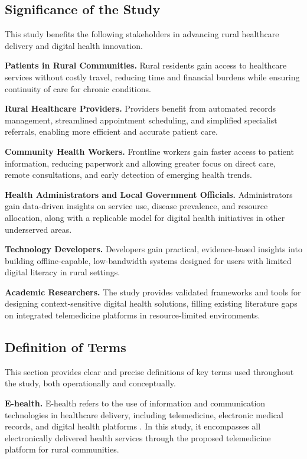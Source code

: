 \documentclass{research}
\begin{document}
\subsection*{Significance of the Study}

This study benefits the following stakeholders in advancing rural healthcare delivery and digital
health innovation.

\textbf{Patients in Rural Communities.} Rural residents gain access to healthcare services
without costly travel, reducing time and financial burdens while ensuring continuity of care for
chronic conditions.

\textbf{Rural Healthcare Providers.} Providers benefit from automated records management,
streamlined appointment scheduling, and simplified specialist referrals, enabling more efficient
and accurate patient care.

\textbf{Community Health Workers.} Frontline workers gain faster access to patient information,
reducing paperwork and allowing greater focus on direct care, remote consultations, and early
detection of emerging health trends.

\textbf{Health Administrators and Local Government Officials.} Administrators gain data-driven
insights on service use, disease prevalence, and resource allocation, along with a replicable
model for digital health initiatives in other underserved areas.

\textbf{Technology Developers.} Developers gain practical, evidence-based insights into building
offline-capable, low-bandwidth systems designed for users with limited digital literacy in rural
settings.

\textbf{Academic Researchers.} The study provides validated frameworks and tools for designing
context-sensitive digital health solutions, filling existing literature gaps on integrated
telemedicine platforms in resource-limited environments.

\subsection*{Definition of Terms}

This section provides clear and precise definitions of key terms used throughout the study, both
operationally and conceptually.

\textbf{E-health.} E-health refers to the use of information and communication technologies in
healthcare delivery, including telemedicine, electronic medical records, and digital health
platforms \cite{WHO2023}. In this study, it encompasses all electronically delivered health
services through the proposed telemedicine platform for rural communities.
\end{document}
